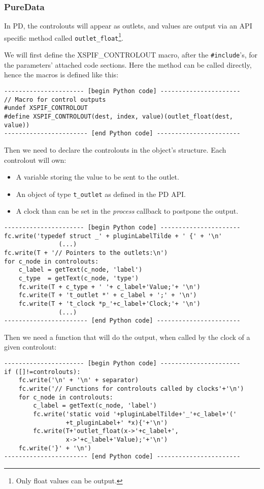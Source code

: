 \subsubsection{PureData}

\noindent In PD, the controlouts will appear as outlets, and values are output via an API specific method called \verb|outlet_float|\footnote{Only float values can be output.}.

\noindent We will first define the XSPIF\_CONTROLOUT macro, after the \verb|#include|'s, for the parameters' attached code sections. Here the method can be called directly, hence the macros is defined like this:

\begin{verbatim}
---------------------- [begin Python code] ----------------------
// Macro for control outputs
#undef XSPIF_CONTROLOUT
#define XSPIF_CONTROLOUT(dest, index, value)(outlet_float(dest, value))
----------------------- [end Python code] -----------------------
\end{verbatim}


\noindent Then we need to declare the controlouts in the object's structure. Each controlout will own:
\begin{itemize}
\item A variable storing the value to be sent to the outlet.
\item An object of type \verb|t_outlet| as defined in the PD API.
\item A clock than can be set in the \textit{process} callback to postpone the output.
\end{itemize}

\begin{verbatim}
---------------------- [begin Python code] ----------------------
fc.write('typedef struct _' + pluginLabelTilde + ' {' + '\n'
               (...)
fc.write(T + '// Pointers to the outlets:\n')
for c_node in controlouts:
    c_label = getText(c_node, 'label')
    c_type  = getText(c_node, 'type')
    fc.write(T + c_type + ' '+ c_label+'Value;'+ '\n')
    fc.write(T + 't_outlet *' + c_label + ';' + '\n')
    fc.write(T + 't_clock *p_'+c_label+'Clock;'+ '\n')
               (...)
----------------------- [end Python code] -----------------------
\end{verbatim}

\noindent Then we need a function that will do the output, when called by the clock 
of a given controlout:

\begin{verbatim}
---------------------- [begin Python code] ----------------------
if ([]!=controlouts):
    fc.write('\n' + '\n' + separator)
    fc.write('// Functions for controlouts called by clocks'+'\n')
    for c_node in controlouts:
        c_label = getText(c_node, 'label')
        fc.write('static void '+pluginLabelTilde+'_'+c_label+'('
                 +t_pluginLabel+' *x){'+'\n')
        fc.write(T+'outlet_float(x->'+c_label+', 
                 x->'+c_label+'Value);'+'\n')
    fc.write('}' + '\n')
----------------------- [end Python code] -----------------------
\end{verbatim}

